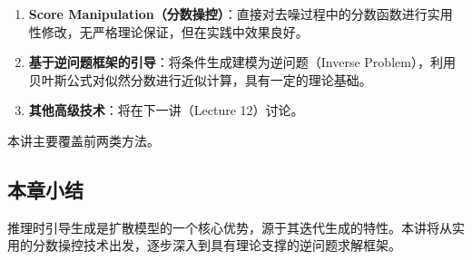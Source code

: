 \begin{enumerate}
    \item \textbf{Score Manipulation（分数操控）}：直接对去噪过程中的分数函数进行实用性修改，无严格理论保证，但在实践中效果良好。
    \item \textbf{基于逆问题框架的引导}：将条件生成建模为逆问题（Inverse Problem），利用贝叶斯公式对似然分数进行近似计算，具有一定的理论基础。
    \item \textbf{其他高级技术}：将在下一讲（Lecture 12）讨论。
\end{enumerate}

本讲主要覆盖前两类方法。

\subsection{本章小结}

推理时引导生成是扩散模型的一个核心优势，源于其迭代生成的特性。本讲将从实用的分数操控技术出发，逐步深入到具有理论支撑的逆问题求解框架。


